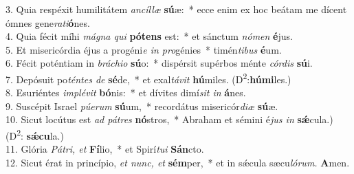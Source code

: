 3. Quia respéxit humilitátem \textit{ancíllæ} \textbf{sú}æ: * ecce enim ex hoc beátam me dícent ómnes gene\textit{rati}\textbf{ó}nes.\\
4. Quia fécit míhi \textit{mágna qui} \textbf{pótens} est: * et sánctum \textit{nómen} \textbf{é}jus.\\
5. Et misericórdia éjus a progéni\textit{e in pro}génies * timén\textit{tibus} \textbf{é}um.\\
6. Fécit poténtiam in \textit{bráchio} \textbf{sú}o: * dispérsit supérbos ménte \textit{córdis} \textbf{sú}i.\\
7. Depósuit po\textit{téntes de} \textbf{sé}de, * et exal\textit{távit} \textbf{hú}miles. (D\textsuperscript{2}:\textbf{húmi}les.)\\
8. Esuriéntes \textit{implévit}  \textbf{bó}nis: * et dívites dimí\textit{sit in} \textbf{á}nes.\\
9. Suscépit Israel \textit{púerum}  \textbf{sú}um, * recordátus misericór\textit{diæ} \textbf{sú}æ.\\
10. Sicut locútus est \textit{ad pátres} \textbf{nó}stros, * Abraham et sémini é\textit{jus in} \textbf{sǽ}cula.) (D\textsuperscript{2}: \textbf{sǽcu}la.)\\
11. Glória \textit{Pátri, et} \textbf{Fí}lio, * et Spirí\textit{tui} \textbf{Sán}cto.\\
12. Sicut érat in princípio, \textit{et nunc, et} \textbf{sém}per, * et in sǽcula sæcu\textit{lórum.} \textbf{A}men.